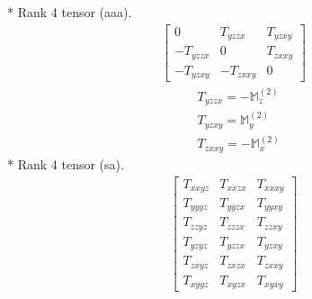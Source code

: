 \documentclass[fleqn,8pt,landscape]{jsarticle}
\begin{document}
* Rank 4 tensor (aaa).
\begin{align*}
\begin{bmatrix} 0 & T_{yzzx} & T_{yzxy} \\ - T_{yzzx} & 0 & T_{zxxy} \\ - T_{yzxy} & - T_{zxxy} & 0 \end{bmatrix}
\end{align*}
\begin{align*}
& T_{yzzx} = - \mathbb{M}_{z}^{(2)} \\
& T_{yzxy} = \mathbb{M}_{y}^{(2)} \\
& T_{zxxy} = - \mathbb{M}_{x}^{(2)}
\end{align*}
* Rank 4 tensor (sa).
\begin{align*}
\begin{bmatrix} T_{xxyz} & T_{xxzx} & T_{xxxy} \\ T_{yyyz} & T_{yyzx} & T_{yyxy} \\ T_{zzyz} & T_{zzzx} & T_{zzxy} \\ T_{yzyz} & T_{yzzx} & T_{yzxy} \\ T_{zxyz} & T_{zxzx} & T_{zxxy} \\ T_{xyyz} & T_{xyzx} & T_{xyxy} \end{bmatrix}
\end{align*}
\end{document}
